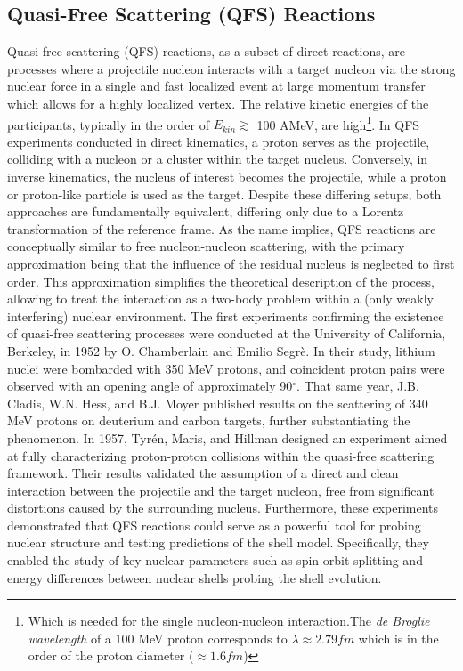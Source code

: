 \subsection{Quasi-Free Scattering (QFS) Reactions}\label{sec:qfs_theo}
Quasi-free scattering (QFS) reactions, as a subset of direct reactions, are processes where a projectile nucleon interacts with a target nucleon via the strong nuclear force in a single and fast localized event at large momentum transfer which allows for a highly localized vertex. The relative kinetic energies of the participants, typically in the order of  $E_{kin}\gtrsim$ 100 AMeV, are high\footnote{Which is needed for the single nucleon-nucleon interaction.The \textit{de Broglie wavelength} of a 100 MeV proton corresponds to $\lambda \approx 2.79fm$ which is in the order of the proton diameter ($\approx 1.6 fm$)}.\newline
In QFS experiments conducted in direct kinematics, a proton serves as the projectile, colliding with a nucleon or a cluster within the target nucleus. Conversely, in inverse kinematics, the nucleus of interest becomes the projectile, while a proton or proton-like particle is used as the target. Despite these differing setups, both approaches are fundamentally equivalent, differing only due to a Lorentz transformation of the reference frame.\newline
As the name implies, QFS reactions are conceptually similar to free nucleon-nucleon scattering, with the primary approximation being that the influence of the residual nucleus is neglected to first order. This approximation simplifies the theoretical description of the process, allowing to treat the interaction as a two-body problem within a (only weakly interfering) nuclear environment.\newline
The first experiments confirming the existence of quasi-free scattering processes were conducted at the University of California, Berkeley, in 1952 by O. Chamberlain and Emilio Segr\`e\cite{chamberlain1952proton}. In their study, lithium nuclei were bombarded with 350 MeV protons, and coincident proton pairs were observed with an opening angle of approximately 90$^{\circ}$. That same year, J.B. Cladis, W.N. Hess, and B.J. Moyer published results on the scattering of 340 MeV protons on deuterium and carbon targets\cite{cladis1952nucleon}, further substantiating the phenomenon.\newline
In 1957, Tyr\'en, Maris, and Hillman designed an experiment aimed at fully characterizing proton-proton collisions within the quasi-free scattering framework\cite{MARIS19581}. Their results validated the assumption of a direct and clean interaction between the projectile and the target nucleon, free from significant distortions caused by the surrounding nucleus. Furthermore, these experiments demonstrated that QFS reactions could serve as a powerful tool for probing nuclear structure and testing predictions of the shell model. Specifically, they enabled the study of key nuclear parameters such as spin-orbit splitting and energy differences between nuclear shells probing the shell evolution. \newline
